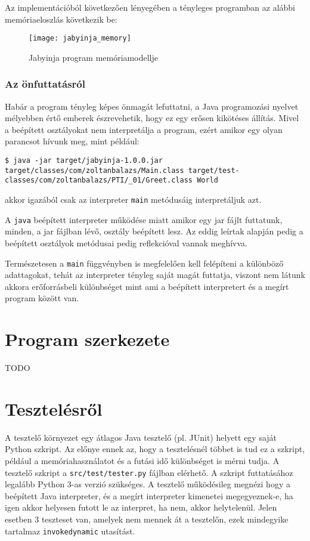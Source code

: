 Az implementációból következően lényegében a tényleges programban az alábbi memóriaeloszlás következik be:

\begin{figure}[H]
	\centering
	\texttt{[image: jabyinja\_memory]}
	\caption{Jabyinja program memóriamodellje}
	\label{fig:memory}
\end{figure}

\subsubsection{Az önfuttatásról}

Habár a program tényleg képes önmagát lefuttatni, a Java programozási nyelvet mélyebben értő emberek észrevehetik, hogy ez egy erősen kikötéses állítás. Mivel a beépített osztályokat nem interpretálja a program, ezért amikor egy olyan parancsot hívunk meg, mint például: 
\begin{verbatim}
$ java -jar target/jabyinja-1.0.0.jar target/classes/com/zoltanbalazs/Main.class target/test-classes/com/zoltanbalazs/PTI/_01/Greet.class World
\end{verbatim}
akkor igazából csak az interpreter \lstinline{main} metódusáig interpretáljuk azt.

A \lstinline{java} beépített interpreter működése miatt amikor egy jar fájlt futtatunk, minden, a jar fájlban lévő, osztály beépített lesz. Az eddig leírtak alapján pedig a beépített osztályok metódusai pedig reflekcióval vannak meghívva.

Természetesen a \lstinline{main} függvényben is megfelelően kell felépíteni a különböző adattagokat, tehát az interpreter tényleg saját magát futtatja, viszont nem látunk akkora erőforrásbeli különbséget mint ami a beépített interpretert és a megírt program között van.

\section{Program szerkezete}

TODO

\section{Tesztelésről}

A tesztelő környezet egy átlagos Java tesztelő (pl. JUnit) helyett egy saját Python szkript. Az előnye ennek az, hogy a tesztelésnél többet is tud ez a szkript, például a memóriahasználatot és a futási idő különbséget is mérni tudja. A tesztelő szkript a \lstinline{src/test/tester.py} fájlban elérhető. A szkript futtatásához legalább Python 3-as verzió szükséges. A tesztelő működésileg megnézi hogy a beépített Java interpreter, és a megírt interpreter kimenetei megegyeznek-e, ha igen akkor helyesen futott le az interpret, ha nem, akkor helytelenül. Jelen esetben 3 teszteset van, amelyek nem mennek át a tesztelőn, ezek mindegyike tartalmaz \lstinline{invokedynamic} utasítást.

